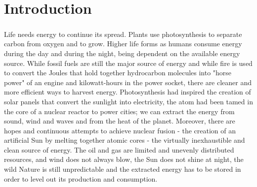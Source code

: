 \chapter{Introduction}
\paragraph*{}
Life needs energy to continue its spread. Plants use photosynthesis to separate carbon from oxygen and to grow. Higher life forms as humans consume energy during the day and during the night, being dependent on the available energy source. While fossil fuels are still the major source of energy and while fire is used to convert the Joules that hold together hydrocarbon molecules into "horse power" of an engine and kilowatt-hours in the power socket, there are cleaner and more efficient ways to harvest energy. Photosynthesis had inspired the creation of solar panels that convert the sunlight into electricity, the atom had been tamed in the core of a nuclear reactor to power cities; we can extract the energy from sound, wind and waves and from the heat of the planet. Moreover, there are hopes and continuous attempts to achieve nuclear fusion - the creation of an artificial Sun by melting together atomic cores - the virtually inexhaustible and clean source of energy. The oil and gas are limited and unevenly distributed resources, and wind does not always blow, the Sun does not shine at night, the wild Nature is still unpredictable and the extracted energy has to be stored in order to level out its production and consumption.\\
